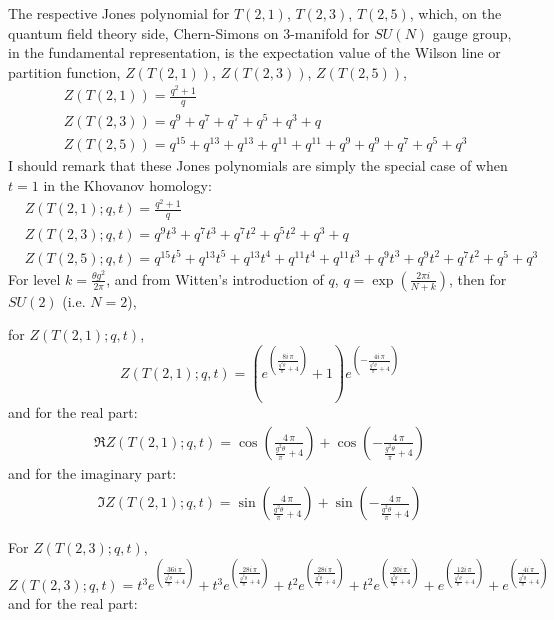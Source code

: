 \documentclass[10pt]{amsart}
\begin{document}
The respective Jones polynomial for $T(2,1)$, $T(2,3)$, $T(2,5)$, which, on the quantum field theory side, Chern-Simons on 3-manifold for $SU(N)$ gauge group, in the fundamental representation, is the expectation value of the Wilson line or partition function, $Z(T(2,1))$, $Z(T(2,3))$, $Z(T(2,5))$,
\[
\begin{aligned}
  & Z(T(2,1)) = \frac{q^{2} + 1}{q}    \\
  & Z(T(2,3)) = q^{9}  + q^{7}  + q^{7}  + q^{5}  + q^{3} + q \\  
  & Z(T(2,5)) = q^{15}  + q^{13}  + q^{13}  + q^{11}  + q^{11}  + q^{9}  + q^{9}  + q^{7}  + q^{5} + q^{3}  
\end{aligned}
\]
I should remark that these Jones polynomials are simply the special case of when $t=1$ in the Khovanov homology:
\[
\begin{aligned}
  & Z(T(2,1);q,t) = \frac{q^{2} + 1}{q}    \\
  & Z(T(2,3);q,t) = q^{9} t^{3} + q^{7} t^{3} + q^{7} t^{2} + q^{5} t^{2} + q^{3} + q \\  
  & Z(T(2,5);q,t) = q^{15} t^{5} + q^{13} t^{5} + q^{13} t^{4} + q^{11} t^{4} + q^{11} t^{3} + q^{9} t^{3} + q^{9} t^{2} + q^{7} t^{2} + q^{5} + q^{3}  
\end{aligned}
\]
For level $k = \frac{\theta g^2}{2\pi}$, and from Witten's introduction \cite{Witten:1988hf} of $q$, $q = \exp{ \left( \frac{2\pi i}{ N+k} \right)}$, then for $SU(2)$ (i.e. $N=2$),

for $Z(T(2,1);q,t)$,
\[
Z(T(2,1);q,t) = {\left(e^{\left(\frac{8 i \, \pi}{\frac{g^{2} \theta}{\pi} + 4}\right)} + 1\right)} e^{\left(-\frac{4 i \, \pi}{\frac{g^{2} \theta}{\pi} + 4}\right)}
\]
and for the real part:
\[
\begin{gathered}
\Re Z(T(2,1);q,t) =   \cos\left(\frac{4 \, \pi}{\frac{g^{2} \theta}{\pi} + 4}\right) + \cos\left(-\frac{4 \, \pi}{\frac{g^{2} \theta}{\pi} + 4}\right)
  \end{gathered}
\]
and for the imaginary part:
\[
\begin{gathered}
  \Im Z(T(2,1);q,t) = \sin\left(\frac{4 \, \pi}{\frac{g^{2} \theta}{\pi} + 4}\right) + \sin\left(-\frac{4 \, \pi}{\frac{g^{2} \theta}{\pi} + 4}\right)
  \end{gathered}
\]

For $Z(T(2,3);q,t)$,
\[
Z(T(2,3);q,t) = t^{3} e^{\left(\frac{36 i \, \pi}{\frac{g^{2} \theta}{\pi} + 4}\right)} + t^{3} e^{\left(\frac{28 i \, \pi}{\frac{g^{2} \theta}{\pi} + 4}\right)} + t^{2} e^{\left(\frac{28 i \, \pi}{\frac{g^{2} \theta}{\pi} + 4}\right)} + t^{2} e^{\left(\frac{20 i \, \pi}{\frac{g^{2} \theta}{\pi} + 4}\right)} + e^{\left(\frac{12 i \, \pi}{\frac{g^{2} \theta}{\pi} + 4}\right)} + e^{\left(\frac{4 i \, \pi}{\frac{g^{2} \theta}{\pi} + 4}\right)}
\]
and for the real part:
\end{document}
